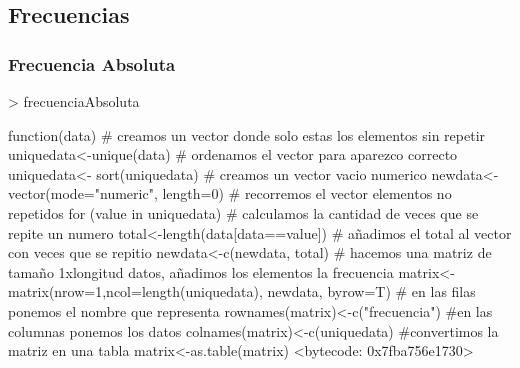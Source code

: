 \documentclass [a4paper] {article}
\begin{document}
\subsection{Frecuencias}
\subsubsection{Frecuencia Absoluta}
\begin{Schunk}
\begin{Sinput}
> frecuenciaAbsoluta
\end{Sinput}
\begin{Soutput}
function(data){
  # creamos un vector donde solo estas los elementos sin repetir
  uniquedata<-unique(data)
  # ordenamos el vector para aparezco correcto 
  uniquedata<- sort(uniquedata)
  # creamos un vector vacio numerico
  newdata<- vector(mode="numeric", length=0)
  # recorremos el vector elementos no repetidos  
  for (value in uniquedata) {
    # calculamos la cantidad de veces que se repite un numero
    total<-length(data[data==value])
    # añadimos el total al vector con veces que se repitio
    newdata<-c(newdata, total)
  }
  # hacemos una matriz de tamaño 1xlongitud datos, añadimos los elementos la frecuencia
  matrix<-matrix(nrow=1,ncol=length(uniquedata), newdata, byrow=T)
  # en las filas ponemos el nombre que representa
  rownames(matrix)<-c("frecuencia")
  #en las columnas ponemos los datos
  colnames(matrix)<-c(uniquedata)
  #convertimos la matriz en una tabla
  matrix<-as.table(matrix)
}
<bytecode: 0x7fba756e1730>
\end{Soutput}
\end{Schunk}
\end{document}
